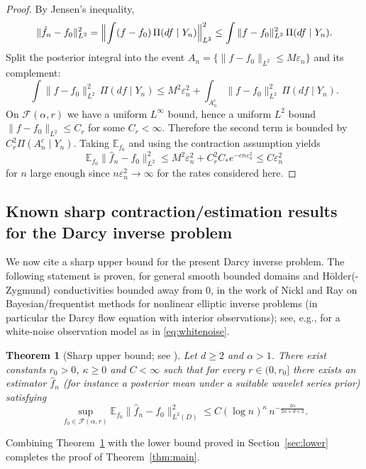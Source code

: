 \documentclass[11pt]{article}
\newtheorem{theorem}{Theorem}
\theoremstyle{definition}
\theoremstyle{remark}
\newcommand{\1}{\mathbf{1}}
\newcommand{\E}{\mathbb{E}}
\begin{document}
\begin{proof}
By Jensen's inequality,
\[
\|\hat f_n-f_0\|_{L^2}^2
=\Bigl\|\int (f-f_0)\,\Pi(df\mid Y_n)\Bigr\|_{L^2}^2
\le \int \|f-f_0\|_{L^2}^2\,\Pi(df\mid Y_n).
\]
Split the posterior integral into the event $A_n=\{\|f-f_0\|_{L^2}\le M\varepsilon_n\}$ and its complement:
\[
\int \|f-f_0\|_{L^2}^2\,\Pi(df\mid Y_n)
\le M^2\varepsilon_n^2
+ \int_{A_n^c}\|f-f_0\|_{L^2}^2\,\Pi(df\mid Y_n).
\]
On $\mathcal F(\alpha,r)$ we have a uniform $L^\infty$ bound, hence a uniform $L^2$ bound $\|f-f_0\|_{L^2}\le C_r$ for some $C_r<\infty$. Therefore the second term is bounded by $C_r^2 \Pi(A_n^c\mid Y_n)$. Taking $\E_{f_0}$ and using the contraction assumption yields
\[
\E_{f_0}\|\hat f_n-f_0\|_{L^2}^2
\le M^2\varepsilon_n^2 + C_r^2 C_* e^{-c n\varepsilon_n^2}
\le C\varepsilon_n^2
\]
for $n$ large enough since $n\varepsilon_n^2\to\infty$ for the rates considered here.
\end{proof}

\subsection{Known sharp contraction/estimation results for the Darcy inverse problem}

We now cite a sharp upper bound for the present Darcy inverse problem. The following statement is proven, for general smooth bounded domains and H\"older(-Zygmund) conductivities bounded away from $0$, in the work of Nickl and Ray on Bayesian/frequentist methods for nonlinear elliptic inverse problems (in particular the Darcy flow equation with interior observations); see, e.g., \cite[Theorem~2.1 and Corollary~2.3]{NicklRayDarcy} for a white-noise observation model as in \eqref{eq:whitenoise}.

\begin{theorem}[Sharp upper bound; see \cite{NicklRayDarcy}]\label{thm:upper-cited}
Let $d\ge2$ and $\alpha>1$. There exist constants $r_0>0$, $\kappa\ge0$ and $C<\infty$ such that for every $r\in(0,r_0]$ there exists an estimator $\hat f_n$ (for instance a posterior mean under a suitable wavelet series prior) satisfying
\[
\sup_{f_0\in\mathcal F(\alpha,r)}
\E_{f_0}\|\hat f_n-f_0\|_{L^2(D)}^2
\le C(\log n)^\kappa\,n^{-\frac{2\alpha}{2\alpha+d+2}}.
\]
\end{theorem}

Combining Theorem~\ref{thm:upper-cited} with the lower bound proved in Section~\ref{sec:lower} completes the proof of Theorem~\ref{thm:main}.
\end{document}
